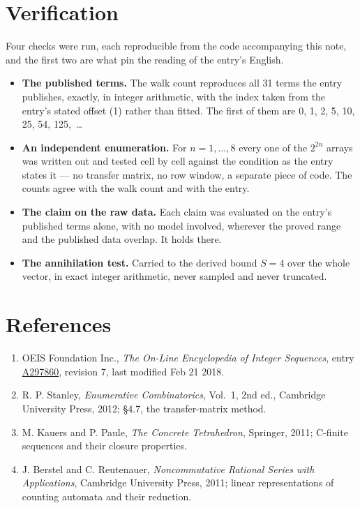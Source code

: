 \documentclass[11pt]{article}
\theoremstyle{definition}
\begin{document}
\section{Verification}

Four checks were run, each reproducible from the code accompanying this note, and the first two are what pin the reading of the entry's English.

\begin{itemize}

\item {\bfseries The published terms.} The walk count reproduces all 31 terms the entry publishes, exactly, in integer arithmetic, with the index taken from the entry's stated offset (1) rather than fitted. The first of them are 0, 1, 2, 5, 10, 25, 54, 125,~\dots

\item {\bfseries An independent enumeration.} For $n = 1,\dots,8$ every one of the $2^{2n}$ arrays was written out and tested cell by cell against the condition as the entry states it --- no transfer matrix, no row window, a separate piece of code. The counts agree with the walk count and with the entry.

\item {\bfseries The claim on the raw data.} Each claim was evaluated on the entry's published terms alone, with no model involved, wherever the proved range and the published data overlap. It holds there.

\item {\bfseries The annihilation test.} Carried to the derived bound $S = 4$ over the whole vector, in exact integer arithmetic, never sampled and never truncated.

\end{itemize}

\section{References}

\begin{enumerate}

\item OEIS Foundation Inc., \emph{The On-Line Encyclopedia of Integer Sequences}, entry \href{https://oeis.org/A297860}{A297860}, revision 7, last modified Feb 21 2018.

\item R. P. Stanley, \emph{Enumerative Combinatorics}, Vol.~1, 2nd ed., Cambridge University Press, 2012; \S4.7, the transfer-matrix method.

\item M. Kauers and P. Paule, \emph{The Concrete Tetrahedron}, Springer, 2011; C-finite sequences and their closure properties.

\item J. Berstel and C. Reutenauer, \emph{Noncommutative Rational Series with Applications}, Cambridge University Press, 2011; linear representations of counting automata and their reduction.

\end{enumerate}
\end{document}
